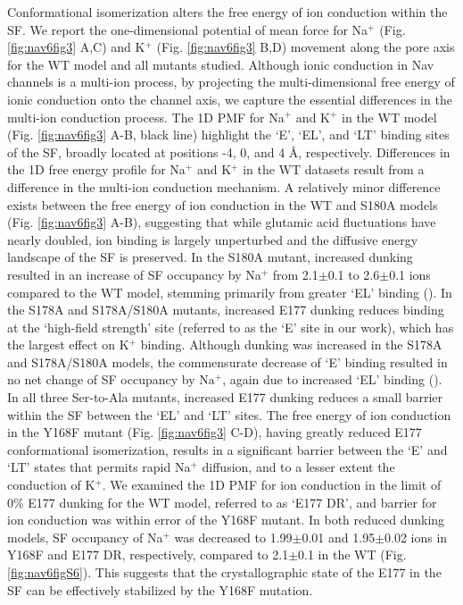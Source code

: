 \begin{refsection}
Conformational isomerization alters the free energy of ion conduction within the SF. We report the one-dimensional potential of mean force for Na$^+$ (Fig. \ref{fig:nav6fig3} A,C) and K$^+$ (Fig. \ref{fig:nav6fig3} B,D) movement along the pore axis for the WT model and all mutants studied. Although ionic conduction in Nav channels is a multi-ion process, by projecting the multi-dimensional free energy of ionic conduction onto the channel axis, we capture the essential differences in the multi-ion conduction process. The 1D PMF for Na$^+$ and K$^+$ in the WT model (Fig. \ref{fig:nav6fig3} A-B, black line) highlight the `E', `EL', and `LT' binding sites of the SF, broadly located at positions -4, 0, and 4 \AA, respectively. Differences in the 1D free energy profile for Na$^+$ and K$^+$ in the WT datasets result from a difference in the multi-ion conduction mechanism. A relatively minor difference exists between the free energy of ion conduction in the WT and S180A models (Fig. \ref{fig:nav6fig3} A-B), suggesting that while glutamic acid fluctuations have nearly doubled, ion binding is largely unperturbed and the diffusive energy landscape of the SF is preserved. In the S180A mutant, increased dunking resulted in an increase of SF occupancy by Na$^+$ from 2.1$\pm$0.1 to 2.6$\pm$0.1 ions compared to the WT model, stemming primarily from greater `EL' binding (). In the S178A and S178A/S180A mutants, increased E177 dunking reduces binding at the `high-field strength' site (referred to as the `E' site in our work), which has the largest effect on K$^+$ binding. Although dunking was increased in the S178A and S178A/S180A models, the commensurate decrease of `E' binding resulted in no net change of SF occupancy by Na$^+$, again due to increased `EL' binding (). In all three Ser-to-Ala mutants, increased E177 dunking reduces a small barrier within the SF between the `EL' and `LT' sites. The free energy of ion conduction in the Y168F mutant (Fig. \ref{fig:nav6fig3} C-D), having greatly reduced E177 conformational isomerization, results in a significant barrier between the `E' and `LT' states that permits rapid Na$^+$ diffusion, and to a lesser extent the conduction of K$^+$. We examined the 1D PMF for ion conduction in the limit of 0\% E177 dunking for the WT model, referred to as `E177 DR', and barrier for ion conduction was within error of the Y168F mutant. In both reduced dunking models, SF occupancy of Na$^+$ was decreased to 1.99$\pm$0.01 and 1.95$\pm$0.02 ions in Y168F and E177 DR, respectively, compared to 2.1$\pm$0.1 in the WT (Fig. \ref{fig:nav6figS6}). This suggests that the crystallographic state of the E177 in the SF can be effectively stabilized by the Y168F mutation. 


\end{refsection}
